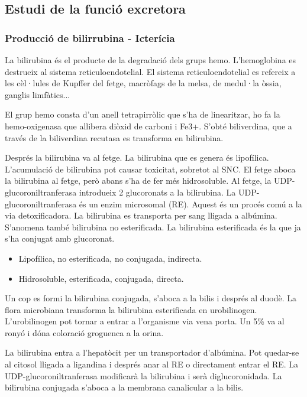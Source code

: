 \subsection{Estudi de la funció excretora}
\label{sec:estudi-de-la}

\subsubsection{Producció de bilirrubina - Icterícia}
\label{sec:prod-de-bilirr}
La bilirubina és el producte de la degradació dels grups
hemo. L'hemoglobina es destrueix al sistema reticuloendotelial. El
sistema reticuloendotelial es refereix a les cèl·lules de Kupffer del
fetge, macròfags de la melsa, de medul·la òssia, ganglis limfàtics...

El grup hemo consta d'un anell tetrapirròlic que s'ha de linearitzar,
ho fa la hemo-oxigenasa que allibera diòxid de carboni i Fe3+. S'obté
biliverdina, que a través de la biliverdina recutasa es transforma en
bilirubina.

Després la bilirubina va al fetge. La bilirubina que es genera és
lipofílica. L'acumulació de bilirubina pot causar toxicitat, sobretot
al SNC. El fetge aboca la bilirubina al fetge, però abans s'ha de fer
més hidrosoluble. Al fetge, la UDP-glucoroniltranferasa introdueix 2
glucoronats a la bilirubina. La UDP-glucoroniltranferasa és un enzim
microsomal (RE). Aquest és un procés comú a la via detoxificadora. La
bilirubina es transporta per sang lligada a albúmina. S'anomena també
bilirubina no esterificada. La bilirubina esterificada és la que ja
s'ha conjugat amb glucoronat.

\begin{itemize}
\item Lipofílica, no esterificada, no conjugada, indirecta.
\item Hidrosoluble, esterificada, conjugada, directa.
\end{itemize}

Un cop es formi la bilirubina conjugada, s'aboca a la bilis i després
al duodè. La flora microbiana transforma la bilirubina esterificada en
urobilinogen. L'urobilinogen pot tornar a entrar a l'organisme via
vena porta. Un 5\% va al ronyó i dóna coloració groguenca a la orina.

La bilirubina entra a l'hepatòcit per un transportador d'albúmina. Pot
quedar-se al citosol lligada a ligandina i després anar al RE o
directament entrar el RE. La UDP-glucoroniltranferasa modificarà la
bilirubina i serà diglucoronidada. La bilirubina conjugada s'aboca a
la membrana canalicular a la bilis.

